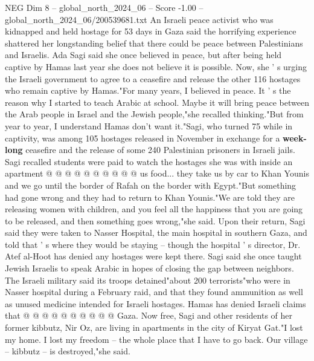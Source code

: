 \begin{textsample}{NEG Dim 8 – global\_north\_2024\_06 – Score -1.00 – global\_north\_2024\_06/200539681.txt}  \label{ex:f8_neg_193}
An Israeli peace activist who was kidnapped and held hostage for 53 days in Gaza said the horrifying experience shattered her longstanding belief that there could be peace between Palestinians and Israelis.
Ada Sagi said she once believed in peace, but after being held captive by Hamas last year she does not believe it is possible.
Now, she ' s urging the Israeli government to agree to a ceasefire and release the other 116 hostages who remain captive by Hamas."For many years, I believed in peace.
It ' s the reason why I started to teach Arabic at school.
Maybe it will bring peace between the Arab people in Israel and the Jewish people,"she recalled thinking."But from year to year, I understand Hamas don't want it."Sagi, who turned 75 while in captivity, was among 105 hostages released in November in exchange for a \textbf{week-long} ceasefire and the release of some 240 Palestinian prisoners in Israeli jails.
Sagi recalled students were paid to watch the hostages she was with inside an apartment @ @ @ @ @ @ @ @ @ @ us food... they take us by car to Khan Younis and we go until the border of Rafah on the border with Egypt."But something had gone wrong and they had to return to Khan Younis."We are told they are releasing women with children, and you feel all the happiness that you are going to be released, and then something goes wrong,"she said.
Upon their return, Sagi said they were taken to Nasser Hospital, the main hospital in southern Gaza, and told that ' s where they would be staying -- though the hospital ' s director, Dr.
Atef al-Hoot has denied any hostages were kept there.
Sagi said she once taught Jewish Israelis to speak Arabic in hopes of closing the gap between neighbors.
The Israeli military said its troops detained"about 200 terrorists"who were in Nasser hospital during a February raid, and that they found ammunition as well as unused medicine intended for Israeli hostages.
Hamas has denied Israeli claims that @ @ @ @ @ @ @ @ @ @ Gaza.
Now free, Sagi and other residents of her former kibbutz, Nir Oz, are living in apartments in the city of Kiryat Gat."I lost my home.
I lost my freedom -- the whole place that I have to go back.
Our village -- kibbutz -- is destroyed,"she said.

\end{textsample}
